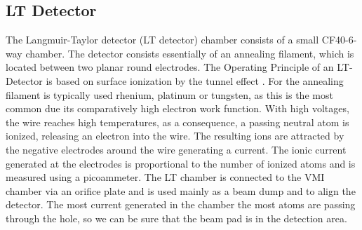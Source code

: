 \subsection{LT Detector}

The Langmuir-Taylor detector (LT detector) chamber consists of a small CF40-6-way chamber. The detector consists essentially of an annealing filament, which is located between two planar round electrodes. The Operating Principle of an LT-Detector is based on surface ionization by the tunnel effect \cite{delhuille_optimization_2002}. For the annealing filament is typically used  rhenium, platinum or tungsten, as this is the most common due its comparatively high electron work function. With high voltages, the wire reaches high temperatures, as a consequence, a passing neutral atom is ionized, releasing an electron into the wire. The resulting ions are attracted by the negative electrodes around the wire generating a current. The ionic current generated at the electrodes is proportional to the number of ionized atoms and is measured using a picoammeter.
The LT chamber is connected to the VMI chamber via an orifice plate and is used mainly as a beam dump and to align the detector. The most current generated in the chamber the most atoms are passing through the hole, so we can be sure that the beam pad is in the detection area.

